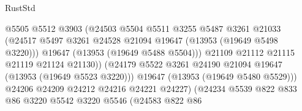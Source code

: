 \begin{lexlean}{RustStd}
\begin{coremodule}
                                            @5505
                                            @5512
                                            @3903
                                            (@24503
                                              @5504
                                              @5511
                                              @3255
                                              @5487
                                              @3261
                                              @21033
                                              (@24517
                                                @5497
                                                @3261
                                                @24528
                                                @21094
                                                @19647
                                                (@13953 (@19649 @5498 @3220)))
                                              @19647
                                              (@13953 (@19649 @5488 @5504)))
                                            @21109
                                            @21112
                                            @21115
                                            @21119
                                            @21124
                                            @21130))
                                        (@24179
                                          @5522
                                          @3261
                                          @24190
                                          @21094
                                          @19647
                                          (@13953 (@19649 @5523 @3220)))
                                        @19647
                                        (@13953 (@19649 @5480 @5529)))
                                      @24206
                                      @24209
                                      @24212
                                      @24216
                                      @24221
                                      @24227)
                                    (@24234
                                      @5539
                                      @822
                                      @833
                                      @86
                                      @3220
                                      @5542
                                      @3220
                                      @5546
                                      (@24583
                                        @822
                                        @86

\end{coremodule}
\end{lexlean}
